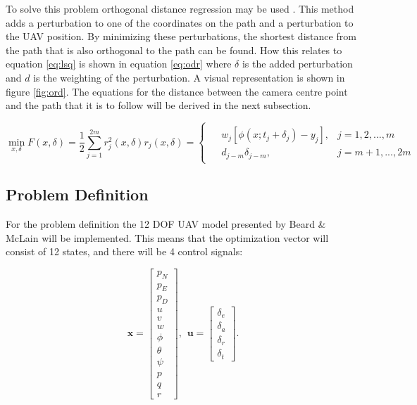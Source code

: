 To solve this problem orthogonal distance regression may be used \cite{nocedalOPTIMIZATION}. This method adds a perturbation to one of the coordinates on the path and a perturbation to the UAV position. By minimizing these perturbations, the shortest distance from the path that is also orthogonal to the path can be found. How this relates to equation \ref{eq:lsq} is shown in equation \ref{eq:odr} where $\delta$ is the added perturbation and $d$ is the weighting of the perturbation. A visual representation is shown in figure \ref{fig:ord}. The equations for the distance between the camera centre point and the path that it is to follow will be derived in the next subsection.

\begin{subequations}
\begin{equation}
	\label{eq:odr}
	\min_{x, \delta} F(x,\delta) = \frac{1}{2}\sum_{j=1}^{2m}r_j^2(x,\delta)
\end{equation}
\begin{equation}
	r_j(x,\delta) = 
	\begin{cases}
	\begin{split}
		& w_j[\phi(x;t_j+\delta_j)-y_j], & j = 1, 2, ..., m \\
		& d_{j-m}\delta_{j-m}, & j = m + 1, ..., 2m
	\end{split}
	\end{cases}
\end{equation}
\end{subequations}


\subsection{Problem Definition}

For the problem definition the 12 DOF UAV model presented by Beard \& McLain \cite{uavBEARD} will be implemented. This means that the optimization vector will consist of 12 states, and there will be 4 control signals:

\begin{equation}
	\mathbf{x} =
	\begin{bmatrix}
		p_N \\ p_E \\ p_D \\
		u \\ v \\ w \\
		\phi \\ \theta \\ \psi \\
		p \\ q \\ r
	\end{bmatrix}
	, \hspace{5pt} \mathbf{u} =
	\begin{bmatrix}
		\delta_e \\ \delta_a \\ \delta_r \\ \delta_t
	\end{bmatrix}.
\end{equation}


